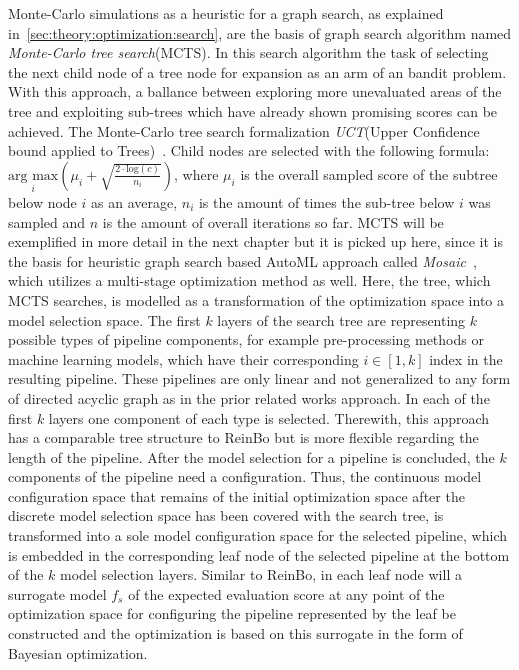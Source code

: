 Monte-Carlo simulations as a heuristic for a graph search, as explained in~\ref{sec:theory:optimization:search}, are the basis of graph search algorithm named \textit{Monte-Carlo tree search}(MCTS).
In this search algorithm the task of selecting the next child node of a tree node for expansion as an arm of an bandit problem.
With this approach, a ballance between exploring more unevaluated areas of the tree and exploiting sub-trees which have already shown promising scores can be achieved.
The Monte-Carlo tree search formalization \textit{UCT}(Upper Confidence bound applied to Trees)~\cite{Kocsis-UCT}.
Child nodes are selected with the following formula: $\underset{i}{\textrm{arg max}} \left( \mu_i + \sqrt{\frac{2 \cdot \textrm{log}(c)}{n_i}} \right)$, where $\mu_i$ is the overall sampled score of the subtree below node $i$ as an average, $n_i$ is the amount of times the sub-tree below $i$ was sampled and $n$ is the amount of overall iterations so far.\newline
MCTS will be exemplified in more detail in the next chapter but it is picked up here, since it is the basis for heuristic graph search based AutoML approach called \textit{Mosaic}~\cite{Rakotoarison-Mosaic}, which utilizes a multi-stage optimization method as well.
Here, the tree, which MCTS searches, is modelled as a transformation of the optimization space into a model selection space.
The first $k$ layers of the search tree are representing $k$ possible types of pipeline components, for example pre-processing methods or machine learning models, which have their corresponding $i \in [1,k]$ index in the resulting pipeline.
These pipelines are only linear and not generalized to any form of directed acyclic graph as in the prior related works approach.
In each of the first $k$ layers one component of each type is selected.
Therewith, this approach has a comparable tree structure to ReinBo but is more flexible regarding the length of the pipeline.\newline
After the model selection for a pipeline is concluded, the $k$ components of the pipeline need a configuration.
Thus, the continuous model configuration space that remains of the initial optimization space after the discrete model selection space has been covered with the search tree, is transformed into a sole model configuration space for the selected pipeline, which is embedded in the corresponding leaf node of the selected pipeline at the bottom of the $k$ model selection layers.
Similar to ReinBo, in each leaf node will a surrogate model $f_s$ of the expected evaluation score at any point of the optimization space for configuring the pipeline represented by the leaf be constructed and the optimization is based on this surrogate in the form of Bayesian optimization.


